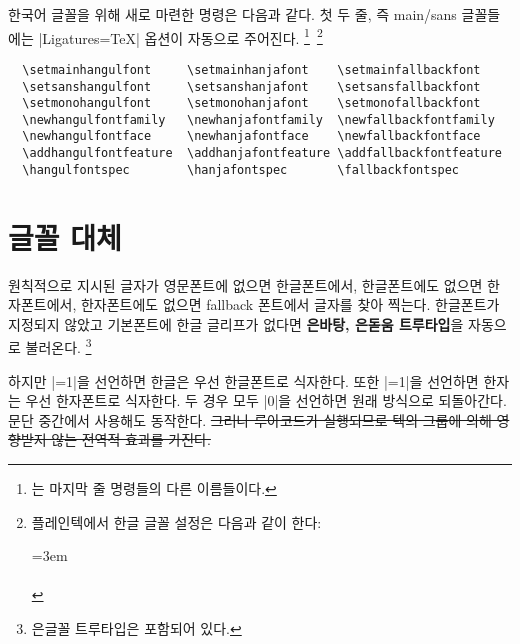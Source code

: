 \documentclass[a4paper]{article}
\def\luatex{\hologo{LuaTeX}}
\def\logoko{\textsf{k}\kern-.0625em\textit{o}}
\def\luatexko{\luatex-\logoko}
\def\texlive{\TeX\ Live}
\def\hemph#1{\textsf{\bfseries #1}}
\begin{document}
한국어 글꼴을 위해 새로 마련한 명령은 다음과 같다.%
\pkgkwd*{\setmainhangulfont}%
\pkgkwd*{\setsanshangulfont}%
\pkgkwd*{\setmonohangulfont}%
\pkgkwd*{\newhangulfontfamily}%
\pkgkwd*{\newhangulfontface}%
\pkgkwd*{\addhangulfontfeature}%
\pkgkwd*{\hangulfontspec}
첫 두 줄, 즉 main/sans 글꼴들에는 |Ligatures=TeX| 옵션이 자동으로 주어진다.%
\footnote{%
    는
  마지막 줄 명령들의 다른 이름들이다. }\,%
\footnote{%
  플레인텍에서 한글 글꼴 설정은 다음과 같이 한다:\par
  \leftskip=3em\noindent
  \\
  \\
   }
\begin{verbatim}
  \setmainhangulfont     \setmainhanjafont    \setmainfallbackfont
  \setsanshangulfont     \setsanshanjafont    \setsansfallbackfont
  \setmonohangulfont     \setmonohanjafont    \setmonofallbackfont
  \newhangulfontfamily   \newhanjafontfamily  \newfallbackfontfamily
  \newhangulfontface     \newhanjafontface    \newfallbackfontface
  \addhangulfontfeature  \addhanjafontfeature \addfallbackfontfeature
  \hangulfontspec        \hanjafontspec       \fallbackfontspec
\end{verbatim}

\section{글꼴 대체}\label{sec:fontswitch}

원칙적으로  지시된 글자가 영문폰트에 없으면 한글폰트에서,
한글폰트에도 없으면 한자폰트에서, 한자폰트에도 없으면 fallback
폰트에서 글자를 찾아 찍는다.
한글폰트가 지정되지 않았고 기본폰트에 한글 글리프가 없다면
\hemph{은바탕, 은돋움 트루타입}을 자동으로 불러온다.%
\footnote{%
  은글꼴 트루타입은  포함되어 있다. }

하지만 \pkgkwd{\hangulbyhangulfont}|=1|을 선언하면 한글은 우선 한글폰트로
식자한다. 또한 \pkgkwd{\hanjabyhanjafont}|=1|을 선언하면 한자는 우선 한자폰트로
식자한다. 두 경우 모두 |0|을 선언하면 원래 방식으로 되돌아간다.
문단 중간에서 사용해도 동작한다. \sout{그러나 루아코드가 실행되므로
텍의 그룹에 의해 영향받지 않는 전역적 효과를 가진다.}
\end{document}
